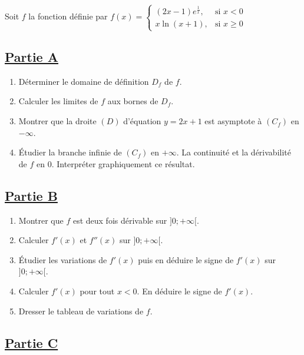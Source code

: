\section*{}

Soit \( f \) la fonction définie par
\( f(x) =
\begin{cases}
    (2x - 1) e^{\frac{1}{x}}, & \text{si } x < 0    \\
    x \ln(x+1),               & \text{si } x \geq 0
\end{cases} \)

\subsection*{\underline{\textbf{Partie A}}}

\begin{enumerate}
    \item Déterminer le domaine de définition \( D_f \) de \( f \).
    \item Calculer les limites de \( f \) aux bornes de \( D_f \).
    \item Montrer que la droite \( (D) \) d’équation \( y = 2x + 1 \) est asymptote à \( (C_f) \) en \( -\infty \).
    \item Étudier la branche infinie de \( (C_f) \) en \( +\infty \). La continuité et la dérivabilité de \( f \) en 0. Interpréter graphiquement ce résultat.
\end{enumerate}

\subsection*{\underline{\textbf{Partie B}}}

\begin{enumerate}
    \item Montrer que \( f \) est deux fois dérivable sur \( ]0; +\infty[ \).
    \item Calculer \( f'(x) \) et \( f''(x) \) sur \( ]0; +\infty[ \).
    \item Étudier les variations de \( f'(x) \) puis en déduire le signe de \( f'(x) \) sur \( ]0; +\infty[ \).
    \item Calculer \( f'(x) \) pour tout \( x < 0 \). En déduire le signe de \( f'(x) \).
    \item Dresser le tableau de variations de \( f \).
\end{enumerate}

\subsection*{\underline{\textbf{Partie C}}}

